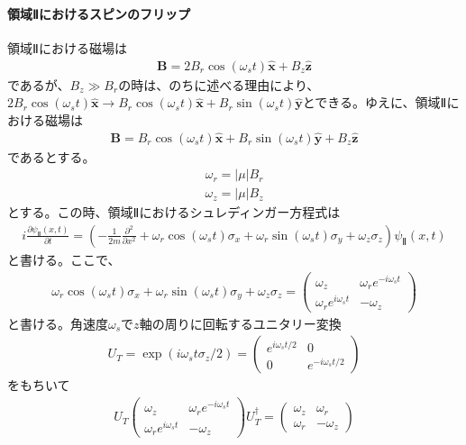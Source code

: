 \paragraph{領域Ⅱにおけるスピンのフリップ}
領域Ⅱにおける磁場は
\begin{align}
\bm{B}=2B_{r}\cos(\omega_{s}t)\bm{\hat{x}}+B_{z}\bm{\hat{z}}
\end{align}
であるが、$B_{z} \gg B_{r}$の時は、のちに述べる理由により、$2B_{r}\cos(\omega_{s}t)\bm{\hat{x}} \to  B_{r}\cos(\omega_{s}t)\bm{\hat{x}}+B_{r}\sin(\omega_{s}t)\bm{\hat{y}}$とできる。ゆえに、領域Ⅱにおける磁場は
\begin{align}
\bm{B}=B_{r}\cos(\omega_{s}t)\bm{\hat{x}}+B_{r}\sin(\omega_{s}t)\bm{\hat{y}}+B_{z}\bm{\hat{z}}
\end{align}
であるとする。
\begin{align}
\omega_{r}=|{\mu}|B_{r}
\end{align}
\begin{align}
\omega_{z}=|{\mu}|B_{z}
\end{align}
とする。この時、領域Ⅱにおけるシュレディンガー方程式は
\begin{align}
i\frac{\partial {\psi}_{Ⅱ}(x,t)}{\partial t}=\left(-\frac{1}{2m}\frac{\partial^2}{\partial x^2}+\omega_{r}\cos(\omega_{s}t){\sigma}_{x}+\omega_{r}\sin(\omega_{s}t){\sigma}_{y}+\omega_{z}{\sigma}_{z}\right){\psi}_{Ⅱ}(x,t)
\end{align}
と書ける。ここで、
\begin{align}
\omega_{r}\cos(\omega_{s}t){\sigma}_{x}+\omega_{r}\sin(\omega_{s}t){\sigma}_{y}+\omega_{z}{\sigma}_{z}=
\begin{pmatrix}
\omega_{z} &\omega_{r}e^{-i\omega_{s}t} \\
\omega_{r}e^{i\omega_{s}t} &-\omega_{z}
\end{pmatrix}
\end{align}
$と書ける。角速度\omega_{s}でz軸の周りに回転するユニタリー変換$
\begin{align}
U_{T}=\exp(i\omega_{s}t{\sigma}_{z}/2)=
\begin{pmatrix}
e^{i\omega_{s}t/2} &0 \\
0 &e^{-i\omega_{s}t/2}
\end{pmatrix}
\end{align}
をもちいて
\begin{align}
U_{T}\begin{pmatrix}
\omega_{z} &\omega_{r}e^{-i\omega_{s}t} \\
\omega_{r}e^{i\omega_{s}t} &-\omega_{z}
\end{pmatrix}U_{T}^{\dagger}=
\begin{pmatrix}
\omega_{z} &\omega_{r} \\
\omega_{r} &-\omega_{z}
\end{pmatrix}
\end{align}
